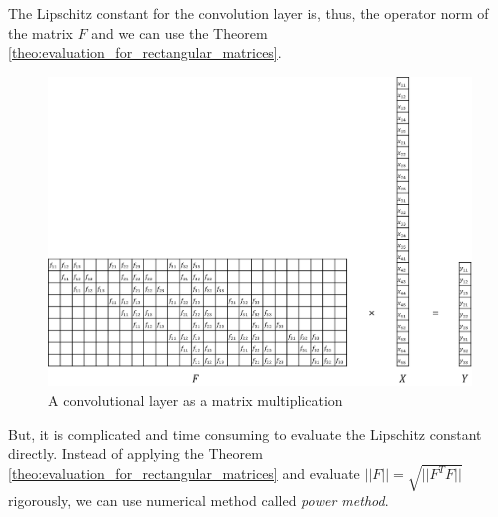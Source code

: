 \documentclass[12pt]{report}
\numberwithin{figure}{chapter}
\theoremstyle{plain}
\theoremstyle{definition}
\theoremstyle{corollary}
\theoremstyle{definition}
\theoremstyle{plain}
\theoremstyle{definition}
\theoremstyle{plain}
\begin{document}
The Lipschitz constant for the convolution layer is, thus, the operator norm of the matrix \(F\) and we can use the Theorem \ref{theo:evaluation_for_rectangular_matrices}.


\begin{figure}[h]
\centering
\includegraphics[width=\textwidth]{convolution_matrix}
\caption{A convolutional layer as a matrix multiplication}
\label{convolution_matrix}
\end{figure}

But, it is complicated and time consuming to evaluate the Lipschitz constant directly.
Instead of applying the Theorem \ref{theo:evaluation_for_rectangular_matrices} and evaluate \(||F||=\sqrt{||F^TF||}\) rigorously, we can use numerical method called \emph{power method}.
\end{document}
